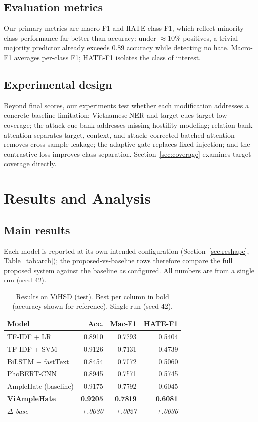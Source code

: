 \documentclass[11pt]{article}
\begin{document}
\subsection{Evaluation metrics}
Our primary metrics are macro-F1 and HATE-class F1, which reflect minority-class performance far better than accuracy: under $\approx$10\% positives, a trivial majority predictor already exceeds 0.89 accuracy while detecting no hate. Macro-F1 averages per-class F1; HATE-F1 isolates the class of interest.

\subsection{Experimental design}
Beyond final scores, our experiments test whether each modification addresses a concrete baseline limitation: Vietnamese NER and target cues target low coverage; the attack-cue bank addresses missing hostility modeling; relation-bank attention separates target, context, and attack; corrected batched attention removes cross-sample leakage; the adaptive gate replaces fixed injection; and the contrastive loss improves class separation. Section~\ref{sec:coverage} examines target coverage directly.

\section{Results and Analysis}

\subsection{Main results}

Each model is reported at its own intended configuration (Section~\ref{sec:reshape}, Table~\ref{tab:arch}); the proposed-vs-baseline rows therefore compare the full proposed system against the baseline as configured. All numbers are from a single run (seed 42).

\begin{table}[t]
  \centering
  \small
  \begin{tabular}{lrrr}
    \toprule
    \textbf{Model} & \textbf{Acc.} & \textbf{Mac-F1} & \textbf{HATE-F1} \\
    \midrule
    TF-IDF + LR          & 0.8910 & 0.7393 & 0.5404 \\
    TF-IDF + SVM         & 0.9126 & 0.7131 & 0.4739 \\
    BiLSTM + fastText    & 0.8454 & 0.7072 & 0.5060 \\
    PhoBERT-CNN          & 0.8945 & 0.7571 & 0.5745 \\
    AmpleHate (baseline) & 0.9175 & 0.7792 & 0.6045 \\
    \textbf{ViAmpleHate} & \textbf{0.9205} & \textbf{0.7819} & \textbf{0.6081} \\
    \textit{$\Delta$ base} & \textit{+.0030} & \textit{+.0027} & \textit{+.0036} \\
    \bottomrule
  \end{tabular}
  \caption{Results on ViHSD (test). Best per column in bold (accuracy shown for reference). Single run (seed 42).}
  \label{tab:vihsd}
\end{table}
\end{document}
